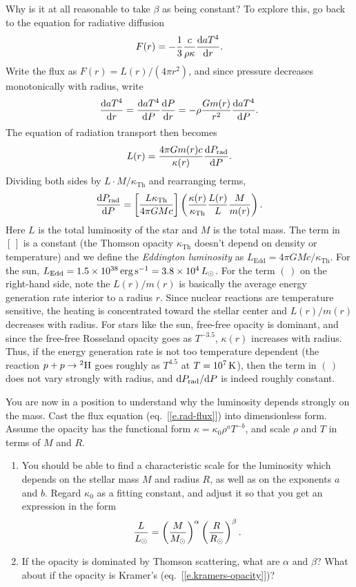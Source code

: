 Why is it at all reasonable to take $\beta$ as being constant? To explore this, go back to the equation for radiative diffusion
\[ F(r) = -\frac{1}{3}\frac{c}{\rho\kappa}\frac{\dif aT^{4}}{\dif r}. \]
Write the flux as $F(r) = L(r)/(4\pi r^{2})$, and since pressure decreases monotonically with radius, write
\[ 
\frac{\dif aT^{4}}{\dif r} = \frac{\dif aT^{4}}{\dif P}\frac{\dif P}{\dif r} = -\rho\frac{Gm(r)}{r^{2}}\frac{\dif aT^{4}}{\dif P}. 
\]
The equation of radiation transport then becomes
\[ L(r) = \frac{4\pi Gm(r) c}{\kappa(r)} \frac{\dif P_{\mathrm{rad}}}{\dif P}. \]
Dividing both sides by $L\cdot M/\kappa_{\mathrm{Th}}$ and rearranging terms,
\begin{equation}\label{e.Prad-P}
 \frac{\dif P_{\mathrm{rad}}}{\dif P} = \left[\frac{L\kappa_{\mathrm{Th}}}{4\pi GMc}\right]\left(\frac{\kappa(r)}{\kappa_{\mathrm{Th}}}\frac{L(r)}{L}\frac{M}{m(r)}\right).
\end{equation}
Here $L$ is the total luminosity of the star and $M$ is the total mass.  The term in $[\,]$ is a constant (the Thomson opacity $\kappa_{\mathrm{Th}}$ doesn't depend on density or temperature) and we define the \emph{Eddington luminosity} as $L_{\mathrm{Edd}}=4\pi GM c/\kappa_{\mathrm{Th}}$.  For the sun, $L_{\mathrm{Edd}} = 1.5\ee{38}\nsp\ergs\usp\second^{-1} = 3.8\ee{4}\nsp L_{\sun}$.  For the term $(\,)$ on the right-hand side, note the $L(r)/m(r)$ is basically the average energy generation rate interior to a radius $r$.  Since nuclear reactions are temperature sensitive, the heating is concentrated toward the stellar center and $L(r)/m(r)$ decreases with radius. For stars like the sun, free-free opacity is dominant, and since the free-free Rosseland opacity goes as $T^{-3.5}$, $\kappa(r)$ increases with radius.  Thus, if the energy generation rate is not too temperature dependent (the reaction $\pt + \pt \to \hydrogen[2]$ goes roughly as $T^{4.5}$ at $T=10^{7}\nsp\K$), then the term in $(\,)$  does not vary strongly with radius, and $\dif P_{\mathrm{rad}}/\dif P$ is indeed roughly constant. 


\begin{exercisebox}
You are now in a position to understand why the luminosity depends strongly on the mass. Cast the flux equation (eq.~[\ref{e.rad-flux}]) into dimensionless form.  Assume the opacity has the functional form $\kappa = \kappa_{0} \rho^{a} T^{-b}$, and scale $\rho$ and $T$ in terms of $M$ and $R$. 

\begin{enumerate}
\item You should be able to find a characteristic scale for the luminosity which depends on the stellar mass $M$ and radius $R$, as well as on the exponents $a$ and $b$. Regard $\kappa_{0}$ as a fitting constant, and adjust it so that you get an expression in the form
\[
	\frac{L}{\Lsun} = \left(\frac{M}{\Msun}\right)^{\alpha} \left(\frac{R}{\Rsun}\right)^{\beta}.
\]

\item If the opacity is dominated by Thomson scattering, what are $\alpha$ and $\beta$?  What about if the opacity is Kramer's (eq.~[\ref{e.kramers-opacity}])?
\end{enumerate}
\end{exercisebox}
